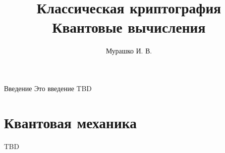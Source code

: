 \documentclass[10pt,pdf,hyperref={unicode}]{beamer}
\title[Криптография и квантовые вычисления]{Классическая
  криптография\\Квантовые вычисления}
\author{Мурашко И. В.}
\institute{Санкт Петербургский Государственный Политехнический Университет}
\date{}
\begin{document}
\begin{frame}
\titlepage
\end{frame}


\begin{frame}{Введение}
Это введение TBD
\end{frame}



\section{Квантовая механика}
\begin{frame}
TBD
\end{frame}
\end{document}
